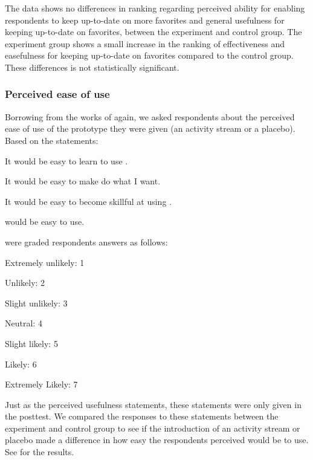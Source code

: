 The data shows no differences in ranking regarding \latest{}
perceived ability for enabling respondents to keep up-to-date on more
favorites and general usefulness for keeping up-to-date on favorites,
between the experiment and control group.
The experiment group shows a small increase in the ranking of
\latest{} effectiveness and easefulness for keeping up-to-date on favorites
compared to the control group. These differences is not statistically
significant.

\subsubsection{Perceived ease of use}

Borrowing from the works of \citet{davis89} again,
we asked respondents about the perceived ease of use
of the prototype they were given (an activity stream or a placebo).
Based on the statements:
\begin{items}
  \item It would be easy to learn to use \latest{}.
  \item It would be easy to make \latest{} do what I want.
  \item It would be easy to become skillful at using \latest{}.
  \item \latest{} would be easy to use.
\end{items}

were graded respondents answers as follows:

\begin{items}
  \item Extremely unlikely: 1
  \item Unlikely: 2
  \item Slight unlikely: 3
  \item Neutral: 4
  \item Slight likely: 5
  \item Likely: 6
  \item Extremely Likely: 7
\end{items}

Just as the perceived usefulness statements, these statements were only
given in the posttest. We compared the responses to these statements
between the experiment and control group to see if the introduction
of an activity stream or placebo made a difference in how easy
the respondents perceived \latest{} would be to use.
See
 for the results.

